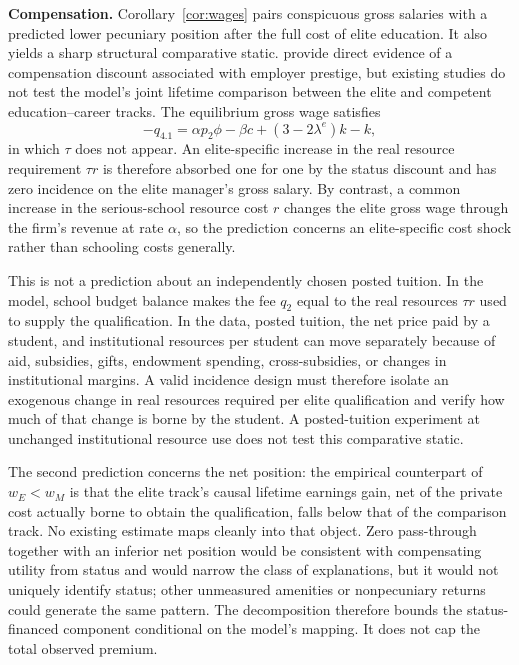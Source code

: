 \documentclass[12pt,letterpaper]{article}
\theoremstyle{definition}
\begin{document}
\textbf{Compensation.}
Corollary~\ref{cor:wages} pairs conspicuous gross salaries with a predicted lower pecuniary position after the full cost of elite education.
It also yields a sharp structural comparative static.
\citet{fockemaugniessenruenzi2017} provide direct evidence of a compensation discount associated with employer prestige, but existing studies do not test the model's joint lifetime comparison between the elite and competent education--career tracks.
The equilibrium gross wage satisfies
\[
-q_{4.1}
=
\alpha p_2\phi-\beta c+(3-2\lambda^e)k-k,
\]
in which $\tau$ does not appear.
An elite-specific increase in the real resource requirement $\tau r$ is therefore absorbed one for one by the status discount and has zero incidence on the elite manager's gross salary.
By contrast, a common increase in the serious-school resource cost $r$ changes the elite gross wage through the firm's revenue at rate $\alpha$, so the prediction concerns an elite-specific cost shock rather than schooling costs generally.

This is not a prediction about an independently chosen posted tuition.
In the model, school budget balance makes the fee $q_2$ equal to the real resources $\tau r$ used to supply the qualification.
In the data, posted tuition, the net price paid by a student, and institutional resources per student can move separately because of aid, subsidies, gifts, endowment spending, cross-subsidies, or changes in institutional margins.
A valid incidence design must therefore isolate an exogenous change in real resources required per elite qualification and verify how much of that change is borne by the student.
A posted-tuition experiment at unchanged institutional resource use does not test this comparative static.

The second prediction concerns the net position: the empirical counterpart of $w_E<w_M$ is that the elite track's causal lifetime earnings gain, net of the private cost actually borne to obtain the qualification, falls below that of the comparison track.
No existing estimate maps cleanly into that object.
Zero pass-through together with an inferior net position would be consistent with compensating utility from status and would narrow the class of explanations, but it would not uniquely identify status; other unmeasured amenities or nonpecuniary returns could generate the same pattern.
The decomposition therefore bounds the status-financed component conditional on the model's mapping.
It does not cap the total observed premium.
\end{document}
